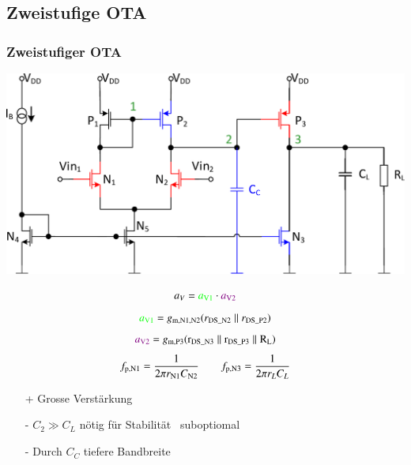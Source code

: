 \subsection{Zweistufige OTA}

\subsubsection{Zweistufiger OTA}

\begin{minipage}[t]{0.5\columnwidth}
    \includegraphics[width=\columnwidth, align=t]{images/11_OTA_zweistufig.pdf}
\end{minipage}
\hfill
\begin{minipage}[t]{0.48\columnwidth}
    \[
        a_V = {\color{green}a_{\rm V1}} \cdot {\color{violet}a_{\rm V2}} 
    \]
    \[
        {\color{green}a_{\rm V1}} = g_{\rm m, N1, N2} (r_{\rm DS\_N2} \parallel r_{\rm DS\_P2})
    \]
    \[
        {\color{violet}a_{\rm V2}} = g_{\rm m, P3} (\rm r_{DS\_N3} \parallel r_{\rm DS\_P3} \parallel R_L)
    \]
    \[
        f_{\rm p,N1} = \frac{1}{2\pi r_{\rm N1} C_{\rm N2}} \qquad f_{\rm p,N3} = \frac{1}{2\pi r_{L} C_{L}}
    \]
\end{minipage}

\smallskip

\begin{minipage}[t]{0.35\columnwidth}
    \begin{itemize}
        \item[+] Grosse Verstärkung
    \end{itemize}
\end{minipage}
\hfill
\begin{minipage}[t]{0.63\columnwidth}
    \begin{itemize}
        \item[-] $C_2 \gg C_L$ nötig für Stabilität \textrightarrow\ suboptiomal
        \item[-] Durch $C_C$ tiefere Bandbreite
    \end{itemize}
\end{minipage}



